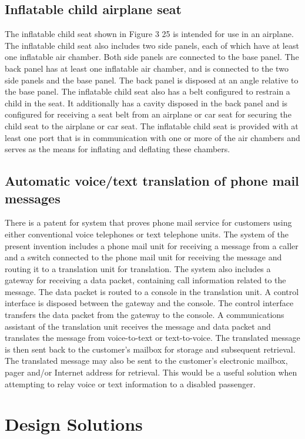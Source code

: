 \documentclass[a4paper, 12pt,conference]{new_cit_thesis}
\begin{document}
\subsection{Inflatable child airplane seat}
The inflatable child seat shown in Figure 3 25 is intended for use in an airplane. The inflatable child seat also includes two side panels, each of which have at least one inflatable air chamber. Both side panels are connected to the base panel. The back panel has at least one inflatable air chamber, and is connected to the two side panels and the base panel. The back panel is disposed at an angle relative to the base panel. The inflatable child seat also has a belt configured to restrain a child in the seat. It additionally has a cavity disposed in the back panel and is configured for receiving a seat belt from an airplane or car seat for securing the child seat to the airplane or car seat. The inflatable child seat is provided with at least one port that is in communication with one or more of the air chambers and serves as the means for inflating and deflating these chambers.

\subsection{Automatic voice/text translation of phone mail messages}
There is a patent for system that proves phone mail service for customers using either conventional voice telephones or text telephone units. The system of the present invention includes a phone mail unit for receiving a message from a caller and a switch connected to the phone mail unit for receiving the message and routing it to a translation unit for translation. The system also includes a gateway for receiving a data packet, containing call information related to the message. The data packet is routed to a console in the translation unit. A control interface is disposed between the gateway and the console. The control interface transfers the data packet from the gateway to the console. A communications assistant of the translation unit receives the message and data packet and translates the message from voice-to-text or text-to-voice. The translated message is then sent back to the customer's mailbox for storage and subsequent retrieval. The translated message may also be sent to the customer's electronic mailbox, pager and/or Internet address for retrieval. This would be a useful solution when attempting to relay voice or text information to a disabled passenger.  

\section*{Design Solutions}
\end{document}
